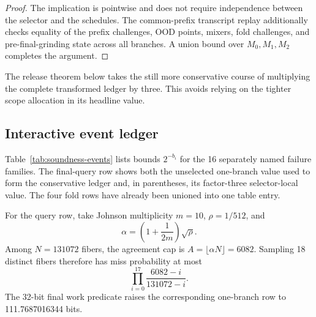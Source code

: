 \begin{proof}
The implication is pointwise and does not require independence between the
selector and the schedules.  The common-prefix transcript replay additionally
checks equality of the prefix challenges, OOD points, mixers, fold challenges,
and pre-final-grinding state across all branches.  A union bound over
\(M_0,M_1,M_2\) completes the argument.
\end{proof}

The release theorem below takes the still more conservative course of
multiplying the complete transformed ledger by three.  This avoids relying on
the tighter scope allocation in its headline value.

\subsection{Interactive event ledger}

Table~\ref{tab:soundness-events} lists bounds \(2^{-b_i}\) for the 16
separately named failure families.  The final-query row shows both the
unselected one-branch value used to form the conservative ledger and, in
parentheses, its factor-three selector-local value.  The four fold rows have
already been unioned into one table entry.

For the query row, take Johnson multiplicity \(m=10\),
\(\rho=1/512\), and
\[
 \alpha=\left(1+\frac{1}{2m}\right)\sqrt{\rho}.
\]
Among \(N=131072\) fibers, the agreement cap is
\(A=\lfloor\alpha N\rfloor=6082\).  Sampling 18 distinct fibers therefore
has miss probability at most
\[
 \prod_{i=0}^{17}\frac{6082-i}{131072-i}.
\]
The 32-bit final work predicate raises the corresponding one-branch row to
111.7687016344 bits.

